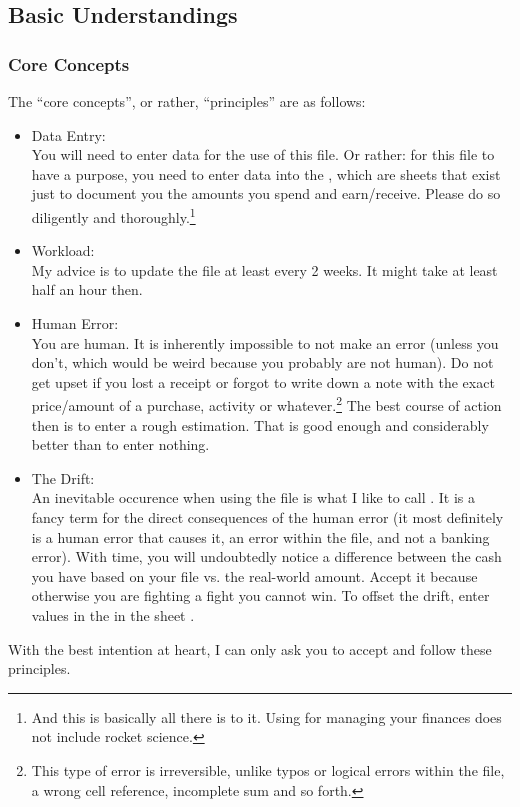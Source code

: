 \subsection{Basic Understandings}
\label{subsec:basic-understandings}

\subsubsection{Core Concepts}
\label{subsubsec:core-concepts}

The ``core concepts'', or rather, ``principles'' are as follows:
\begin{itemize}
	\item Data Entry:\\
	You will need to enter data for the use of this file.
	Or rather: for this file to have a purpose, you need to enter data into the , which are sheets that exist just to document you the amounts you spend and earn/receive.
	Please do so diligently and thoroughly.\footnote{And this is basically all there is to it.
	Using \tfn for managing your finances does not include rocket science.}
	\item Workload:\\
	My advice is to update the file at least every 2 weeks.
	It might take at least half an hour then.
	\item Human Error:\\
	You are human.
	It is inherently impossible to not make an error (unless you don't, which would be weird because you probably are not human).
	Do not get upset if you lost a receipt or forgot to write down a note with the exact price/amount of a purchase, activity or whatever.\footnote{This type of error is irreversible, unlike typos or logical errors within the file, \eg a wrong cell reference, incomplete sum and so forth.}
	The best course of action then is to enter a rough estimation.
	That is good enough and considerably better than to enter nothing.
	\item The Drift:\\
	An inevitable occurence when using the file is what I like to call .
	It is a fancy term for the direct consequences of the human error (it most definitely is a human error that causes it, \ie an error within the file, and not a banking error).
	With time, you will undoubtedly notice a difference between the cash you have based on your file vs. the real-world amount.
	Accept it because otherwise you are fighting a fight you cannot win.
	To offset the drift, enter values in the  in the sheet .
\end{itemize}
With the best intention at heart, I can only ask you to accept and follow these principles.

